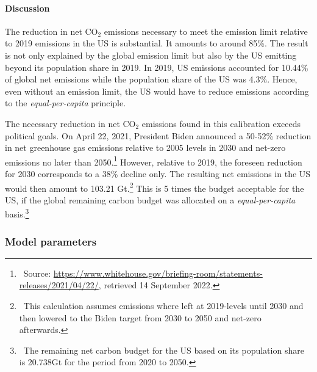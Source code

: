 \paragraph{Discussion}
The reduction in net CO$_2$ emissions necessary to meet the emission limit relative to 2019 emissions in the US  is substantial. It amounts to around 85\%. The result is not only explained by the global emission limit but also by the US emitting beyond its population share in 2019. In 2019, US emissions accounted for 10.44\% of global net emissions while the population share of the US was 4.3\%. Hence, even without an emission limit, the US would have to reduce emissions according to the \textit{equal-per-capita} principle.

The necessary reduction in net CO$_2$ emissions found in this calibration exceeds political goals. On April 22, 2021, President Biden announced a 50-52\% reduction in net greenhouse gas emissions relative to 2005 levels in 2030 %
and net-zero emissions no later than 2050.\footnote{\ Source: \href{https://www.whitehouse.gov/briefing-room/statements-releases/2021/04/22/fact-sheet-president-biden-sets-2030-greenhouse-gas-pollution-reduction-target-aimed-at-creating-good-paying-union-jobs-and-securing-u-s-leadership-on-clean-energy-technologies/}{https://www.whitehouse.gov/briefing-room/statements-releases/2021/04/22/}, retrieved 14 September 2022.} 
However, relative to 2019, the foreseen reduction for 2030 corresponds to a 38\% decline only.
The resulting net emissions in the US would then amount to 103.21 Gt.\footnote{\ This calculation assumes emissions where left at 2019-levels until 2030 and then lowered to the Biden target from 2030 to 2050 and net-zero afterwards.} This is 5 times the budget acceptable for the US,  if the global remaining carbon budget was allocated on a \textit{equal-per-capita} basis.\footnote{\ The remaining net carbon budget for the US based on its population share is 20.738Gt for the period from 2020 to 2050.} %

\subsubsection{Model parameters}\label{sec:modpar}

